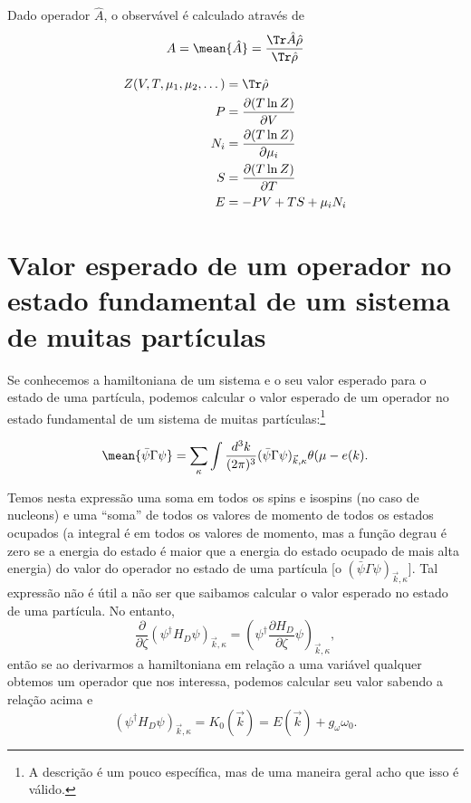 Dado operador $\hat{A}$, o observável é calculado através de
\begin{equation}
	A = \mean{\hat{A}} = \frac{\Tr \hat{A}\hat{\rho}}{\Tr \hat{\rho}}
\end{equation}

\begin{align}
	Z(V, T, \mu_1, \mu_2, \dots) &= \Tr \hat{\rho} \\
	P &= \frac{\partial(T\ln Z)}{\partial V} \\
	N_i &= \frac{\partial (T \ln Z)}{\partial \mu_i} \\
	S &= \frac{\partial (T \ln Z)}{\partial T} \\
	E &= - PV + TS + \mu_i N_i
\end{align}

\section{Valor esperado de um operador no estado fundamental de um sistema de muitas partículas}

Se conhecemos a hamiltoniana de um sistema e o seu valor esperado para o estado de uma partícula, podemos calcular o valor esperado de um operador no estado fundamental de um sistema de muitas partículas\cite{Glendenning}:\footnote{A descrição é um pouco específica, mas de uma maneira geral acho que isso é válido.}

\begin{equation}
	\mean{\bar\psi\Gamma\psi} = \sum_{\kappa} \int \frac{d^3k}{(2\pi)^3} (\bar\psi\Gamma\psi)_{\vec{k},\kappa} \theta(\mu - e(k).
\end{equation}

Temos nesta expressão uma soma em todos os spins e isospins (no caso de nucleons) e uma ``soma'' de todos os valores de momento de todos os estados ocupados (a integral é em todos os valores de momento, mas a função degrau é zero se a energia do estado é maior que a energia do estado ocupado de mais alta energia) do valor do operador no estado de uma partícula [o $(\bar\psi\Gamma\psi)_{\vec{k},\kappa}$]. Tal expressão não é útil a não ser que saibamos calcular o valor esperado no estado de uma partícula. No entanto,
\begin{equation}
	\frac{\partial}{\partial \zeta}(\psi^\dagger H_D\psi)_{\vec{k},\kappa} = (\psi^\dagger \frac{\partial H_D}{\partial \zeta} \psi)_{\vec{k},\kappa},
\end{equation}
%
então se ao derivarmos a hamiltoniana em relação a uma variável qualquer obtemos um operador que nos interessa, podemos calcular seu valor sabendo a relação acima e
\begin{equation}
	(\psi^\dagger H_D\psi)_{\vec{k},\kappa} = K_0(\vec{k}) = E(\vec{k}) + g_\omega \omega_0.
\end{equation}

